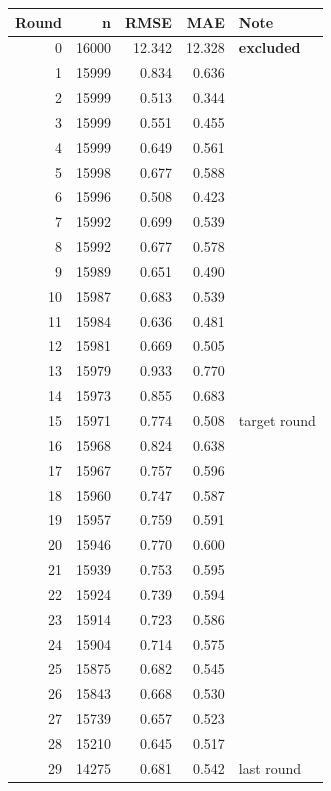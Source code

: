 \documentclass[11pt]{article}
\begin{document}
\bigskip
\begin{longtable}{rrrrl}
\toprule
\textbf{Round} & \textbf{n} & \textbf{RMSE} & \textbf{MAE} & \textbf{Note} \\
\midrule
\endhead
\rowcolor{red!20}
0  & 16000 & 12.342 & 12.328 & \textbf{excluded} \\
1  & 15999 & 0.834  & 0.636 & \\
2  & 15999 & 0.513  & 0.344 & \\
3  & 15999 & 0.551  & 0.455 & \\
4  & 15999 & 0.649  & 0.561 & \\
5  & 15998 & 0.677  & 0.588 & \\
6  & 15996 & 0.508  & 0.423 & \\
7  & 15992 & 0.699  & 0.539 & \\
8  & 15992 & 0.677  & 0.578 & \\
9  & 15989 & 0.651  & 0.490 & \\
10 & 15987 & 0.683  & 0.539 & \\
11 & 15984 & 0.636  & 0.481 & \\
12 & 15981 & 0.669  & 0.505 & \\
13 & 15979 & 0.933  & 0.770 & \\
14 & 15973 & 0.855  & 0.683 & \\
15 & 15971 & 0.774  & 0.508 & target round \\
16 & 15968 & 0.824  & 0.638 & \\
17 & 15967 & 0.757  & 0.596 & \\
18 & 15960 & 0.747  & 0.587 & \\
19 & 15957 & 0.759  & 0.591 & \\
20 & 15946 & 0.770  & 0.600 & \\
21 & 15939 & 0.753  & 0.595 & \\
22 & 15924 & 0.739  & 0.594 & \\
23 & 15914 & 0.723  & 0.586 & \\
24 & 15904 & 0.714  & 0.575 & \\
25 & 15875 & 0.682  & 0.545 & \\
26 & 15843 & 0.668  & 0.530 & \\
27 & 15739 & 0.657  & 0.523 & \\
28 & 15210 & 0.645  & 0.517 & \\
29 & 14275 & 0.681  & 0.542 & last round \\
\bottomrule
\end{longtable}
\end{document}

